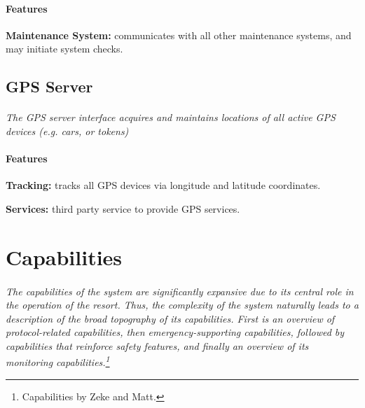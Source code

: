 \documentclass[12pt]{article}
\begin{document}
	\paragraph{Features}
	\begin{list}{}{}
		\item \textbf{Maintenance System:} communicates with all other maintenance systems,
		and may initiate system checks. 
	\end{list}

	\subsection{GPS Server}
	\paragraph{} \textit{The GPS server interface acquires and maintains locations of all 
	active GPS devices (e.g. cars, or tokens)}		
	
	\paragraph{Features}
	\begin{list}{}{}
		\item \textbf{Tracking:} tracks all GPS devices via longitude and latitude coordinates.
        \item \textbf{Services:} third party service to provide GPS services.
	\end{list}

\section{Capabilities}
\label{cap}
\paragraph{}\textit{The capabilities of the system are significantly expansive due to its central role
in the operation of the resort. Thus, the complexity of the system naturally leads to a description
of the broad topography of its capabilities. First is an overview of protocol-related capabilities, then
emergency-supporting capabilities, followed by capabilities that reinforce safety features, and finally an 
overview of its monitoring capabilities.\footnote {Capabilities by Zeke and Matt.}}
\end{document}
